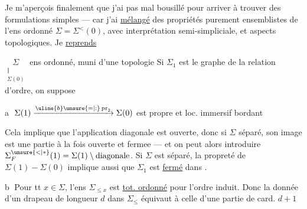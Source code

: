 Je m'aperçois finalement que j'ai
pas mal bousillé pour arriver à trouver des
formulations simples --- car j'ai \uline{mélangé} des
propriétés purement ensemblistes de l'ens ordonné
$\Sigma=\Sigma^{<}(0)$, avec  interprétation semi-simpliciale,
et  aspects topologiques. Je \uline{reprends}

$\underset{\substack{\Vert\\\Sigma(0)}}{\Sigma}$ ens ordonné, muni d'une topologie 
Si $\Sigma_1$ est le graphe de la relation d'ordre, on suppose

\textcircled{a} $\Sigma(1)\xrightarrow{\uline{b}\unsure{=|:}\operatorname{pr}_2}\Sigma(0)$ est propre et loc. immersif bordant
 

 
Cela implique que l'application diagonale est
ouverte, donc si $\Sigma$ séparé, son image est une
partie à la fois ouverte et fermee --- et on
peut alors introduire $\Sigma_F^{\unsure{<|*}}(1)=\Sigma(1)\setminus\text{diagonale}$.
Si $\Sigma$ est séparé, la propreté de $\Sigma(1)-\Sigma(0)$
implique aussi que $\Sigma_1$ est \uline{fermé} dans \inserted{$\Sigma\times\Sigma$}.

\textcircled{b} Pour tt $x\in\Sigma$, l'ens  $\Sigma_{\leq x}$  est \uline{tot. ordonné}
pour l'ordre induit.
 Donc la donnée d'un drapeau  de longueur
$d$ dans $\Sigma_\leq$ équivaut à celle d'une partie de card. $d+1$


